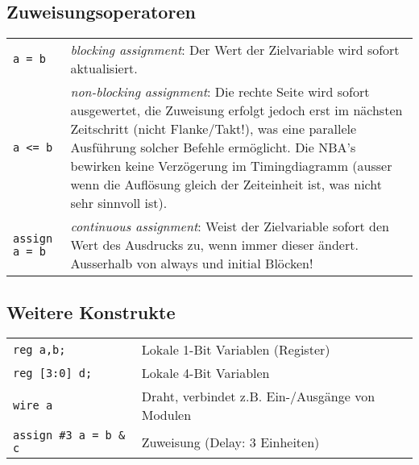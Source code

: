 \begin{multicols}{2}
	\subsection*{Zuweisungsoperatoren}
	\lstset{basicstyle=\ttfamily\normalsize\mdseries}
	\begin{tabular}{lp{6.5cm}}
		\lstinline+a = b+   &   \emph{blocking assignment}: Der Wert der Zielvariable wird sofort aktualisiert. \\
		\lstinline+a <= b+   &   \emph{non-blocking assignment}: Die rechte Seite wird	
	sofort ausgewertet, die Zuweisung erfolgt jedoch erst im nächsten Zeitschritt (nicht Flanke/Takt!), was eine parallele
	Ausführung solcher Befehle ermöglicht. Die NBA's bewirken keine Verzögerung im Timingdiagramm (ausser wenn die Auflösung
	gleich der Zeiteinheit ist, was nicht sehr sinnvoll ist). \\
		\lstinline+assign a = b+ & \emph{continuous assignment}: Weist der Zielvariable sofort den Wert des Ausdrucks zu, wenn immer dieser ändert. Ausserhalb von always und initial Blöcken!
	\end{tabular}
	
	
	\subsection*{Weitere Konstrukte}
	\lstset{basicstyle=\ttfamily\normalsize\mdseries}
	\begin{tabular}{lp{5cm}}
		\lstinline+reg a,b;+   &   Lokale 1-Bit Variablen (Register) \\
		\lstinline+reg [3:0] d;+   &   Lokale 4-Bit Variablen \\
		\lstinline+wire a+   &   Draht, verbindet z.B. Ein-/Ausgänge von Modulen \\
		\lstinline+assign #3 a = b & c+   &   Zuweisung (Delay: 3 Einheiten) \\
	\end{tabular}
	
	
	\end{multicols}
	
	